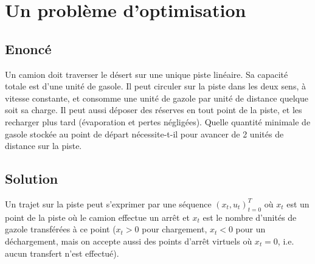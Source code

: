 \documentclass{article}
\begin{document}
\section{Un problème d'optimisation}

\subsection{Enoncé}
Un camion doit traverser le désert sur une unique piste linéaire. Sa capacité totale est d'une unité de gasole. Il peut circuler sur la piste dans les deux sens, à vitesse constante, et consomme une unité de gazole par unité de distance quelque soit sa charge. Il peut aussi déposer des réserves en tout point de la piste, et les recharger plus tard (évaporation et pertes négligées). Quelle quantité minimale de gasole stockée au point de départ nécessite-t-il pour avancer de 2 unités de distance sur la piste.
\subsection{Solution}
Un trajet sur la piste peut s'exprimer par une séquence $(x_t,u_t)_{t=0}^T$ où $x_t$ est un point de la piste où le camion effectue un arrêt et $x_t$ est le nombre d'unités de gazole transférées à ce point ($x_t>0$ pour chargement, $x_t<0$ pour un déchargement, mais on accepte aussi des points d'arrêt virtuels où $x_t=0$, i.e. aucun transfert n'est effectué).
\end{document}

